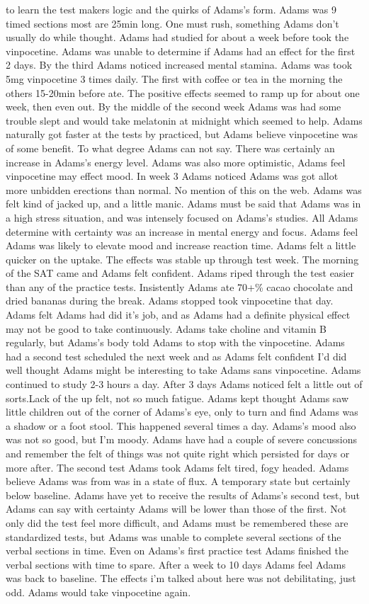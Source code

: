 \documentclass[12pt]{book}
\begin{document}
to learn the test makers logic and the quirks of Adams's form. Adams was 9 timed sections most are 25min long. One must rush, something Adams don't usually do while thought. Adams had studied for about a week before took the vinpocetine. Adams was unable to determine if Adams had an effect for the first 2 days. By the third Adams noticed increased mental stamina. Adams was took 5mg vinpocetine 3 times daily. The first with coffee or tea in the morning the others 15-20min before ate. The positive effects seemed to ramp up for about one week, then even out. By the middle of the second week Adams was had some trouble slept and would take melatonin at midnight which seemed to help. Adams naturally got faster at the tests by practiced, but Adams believe vinpocetine was of some benefit. To what degree Adams can not say. There was certainly an increase in Adams's energy level. Adams was also more optimistic, Adams feel vinpocetine may effect mood. In week 3 Adams noticed Adams was got allot more unbidden erections than normal. No mention of this on the web. Adams was felt kind of jacked up, and a little manic. Adams must be said that Adams was in a high stress situation, and was intensely focused on Adams's studies. All Adams determine with certainty was an increase in mental energy and focus. Adams feel Adams was likely to elevate mood and increase reaction time. Adams felt a little quicker on the uptake. The effects was stable up through test week. The morning of the SAT came and Adams felt confident. Adams riped through the test easier than any of the practice tests. Insistently Adams ate 70+\% cacao chocolate and dried bananas during the break. Adams stopped took vinpocetine that day. Adams felt Adams had did it's job, and as Adams had a definite physical effect may not be good to take continuously. Adams take choline and vitamin B regularly, but Adams's body told Adams to stop with the vinpocetine. Adams had a second test scheduled the next week and as Adams felt confident I'd did well thought Adams might be interesting to take Adams sans vinpocetine. Adams continued to study 2-3 hours a day. After 3 days Adams noticed felt a little out of sorts.Lack of the up felt, not so much fatigue. Adams kept thought Adams saw little children out of the corner of Adams's eye, only to turn and find Adams was a shadow or a foot stool. This happened several times a day. Adams's mood also was not so good, but I'm moody. Adams have had a couple of severe concussions and remember the felt of things was not quite right which persisted for days or more after. The second test Adams took Adams felt tired, fogy headed. Adams believe Adams was from was in a state of flux. A temporary state but certainly below baseline. Adams have yet to receive the results of Adams's second test, but Adams can say with certainty Adams will be lower than those of the first. Not only did the test feel more difficult, and Adams must be remembered these are standardized tests, but Adams was unable to complete several sections of the verbal sections in time. Even on Adams's first practice test Adams finished the verbal sections with time to spare. After a week to 10 days Adams feel Adams was back to baseline. The effects i'm talked about here was not debilitating, just odd. Adams would take vinpocetine again.
\end{document}
